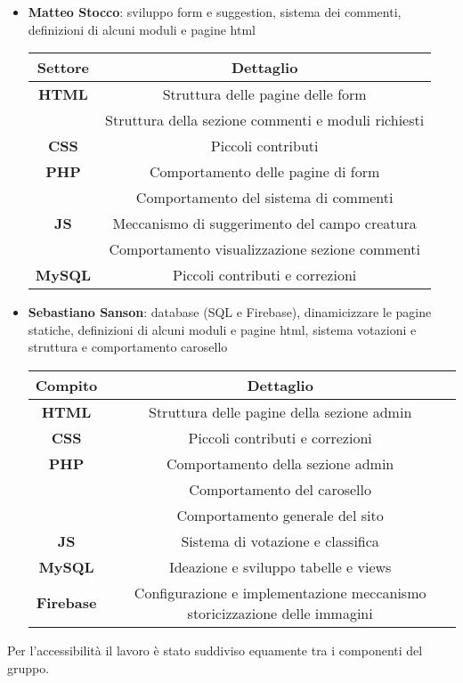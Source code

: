 \begin{itemize}
    \item \textbf{Matteo Stocco}: sviluppo form e suggestion, sistema dei commenti, definizioni di alcuni moduli e pagine html
    \begin{center}
        \begin{tabular}{| c | c |}
            \hline
            \textbf{Settore} & \textbf{Dettaglio}  \\ [0.5ex]
            \hline \hline
            \textbf{HTML} & Struttura delle pagine delle form \\
            & Struttura della sezione commenti e moduli richiesti \\
            \hline
            \textbf{CSS} & Piccoli contributi \\
            \hline
            \textbf{PHP} & Comportamento delle pagine di form \\
            & Comportamento del sistema di commenti \\
            \hline
            \textbf{JS} & Meccanismo di suggerimento del campo creatura \\
            & Comportamento visualizzazione sezione commenti \\
            \hline
            \textbf{MySQL} & Piccoli contributi e correzioni \\
            \hline
        \end{tabular}
    \end{center}
    \item \textbf{Sebastiano Sanson}: database (SQL e Firebase), dinamicizzare le pagine statiche, definizioni di alcuni moduli e pagine html, sistema votazioni e struttura e comportamento carosello
    \begin{center}
        \begin{tabular}{| c | c |}
            \hline
            \textbf{Compito} & \textbf{Dettaglio}  \\ [0.5ex]
            \hline \hline
            \textbf{HTML} & Struttura delle pagine della sezione admin \\
            \hline
            \textbf{CSS} & Piccoli contributi e correzioni \\
            \hline
            \textbf{PHP} & Comportamento della sezione admin \\
            & Comportamento del carosello \\
            & Comportamento generale del sito \\
            \hline
            \textbf{JS} & Sistema di votazione e classifica \\
            \hline
            \textbf{MySQL} & Ideazione e sviluppo tabelle e views \\
            \hline
            \textbf{Firebase} & Configurazione e implementazione meccanismo storicizzazione delle immagini \\
            \hline
        \end{tabular}
    \end{center}
\end{itemize}

Per l'accessibilità il lavoro è stato suddiviso equamente tra i componenti del gruppo.